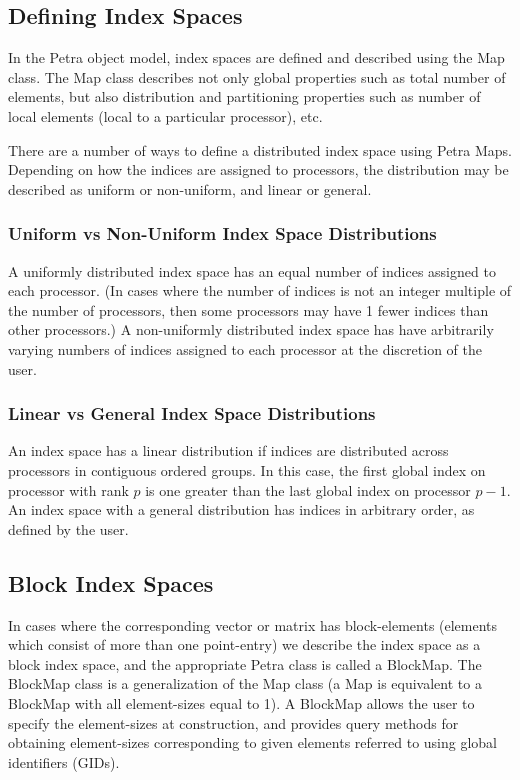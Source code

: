 \documentclass[12pt,relax]{PetraObjectModel}
\begin{document}
\subsection{Defining Index Spaces}
In the Petra object model, index spaces are defined and described using the
Map class. The Map class describes not only global properties such as total
number of elements, but also distribution and partitioning properties such as
number of local elements (local to a particular processor), etc.
 
There are a number of ways to define a distributed index space using Petra
Maps. Depending on how the indices are assigned to processors, the distribution
may be described as uniform or non-uniform, and linear or general.

\subsubsection{Uniform vs Non-Uniform Index Space Distributions}
A uniformly distributed index space has an equal number of indices assigned
to each processor. (In cases where the number of indices is not an integer
multiple of the number of processors, then some processors may have 1 fewer
indices than other processors.) A non-uniformly distributed index space has
have arbitrarily varying numbers of indices assigned to each processor at
the discretion of the user.

\subsubsection{Linear vs General Index Space Distributions}
An index space has a linear distribution if indices are distributed across
processors in contiguous ordered groups. In this case, the first global index
on processor with rank $p$ is one greater than the last global index on
processor $p-1$. An index space with
a general distribution has indices in arbitrary order, as defined by the user.

\subsection{Block Index Spaces}
In cases where the corresponding vector or matrix has block-elements (elements
which consist of more than one point-entry) we describe the index space as a
block index space, and the appropriate Petra class is called a BlockMap. The
BlockMap class is a generalization of the Map class (a Map is equivalent to a
BlockMap with all element-sizes equal to 1). A BlockMap allows the user to
specify the element-sizes at construction, and provides query methods for
obtaining element-sizes corresponding to given elements referred to using
global identifiers (GIDs).
\end{document}
